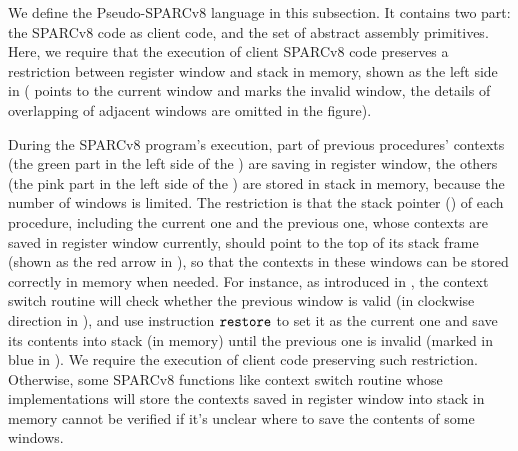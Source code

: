 We define the Pseudo-SPARCv8 language in this 
subsection. It contains two part: 
the SPARCv8 code as client code, 
and the set of abstract assembly primitives. 
Here, we require that the execution of client SPARCv8 code 
preserves a restriction between register 
window and stack in memory, shown
as the left side in \Fig{\ref{fig:Abstraction of Register Windows and Memory}}
(\regcwp{} points to the current window and \regwim{} marks 
the invalid window, the details of overlapping 
of adjacent windows are omitted in the figure).
\begin{center}
    
    \vspace*{-0.5em}
    \label{fig:Abstraction of Register Windows and Memory}
    \vspace{-0.5em}
\end{center}
During the SPARCv8 program's execution, 
part of previous procedures' contexts 
(the green part in the left side of the 
\Fig{\ref{fig:Abstraction of Register Windows and Memory}}) 
are saving in register window, the others 
(the pink part in the left side of the 
\Fig{\ref{fig:Abstraction of Register Windows and Memory}})
are stored in stack in memory, 
because the number of windows is limited. 
The restriction is that the stack pointer 
(\spreg{}) of each procedure, 
including the current one and the previous one, 
whose contexts are saved in register 
window currently, should point to the top of its stack frame 
(shown as the red arrow in 
\Fig{\ref{fig:Abstraction of Register Windows and Memory}}),
so that the contexts 
in these windows can be stored correctly 
in memory when needed. For instance, as  
introduced in \Sec{\ref{sec:ctxswitch}}, the 
context switch routine will check 
whether the previous window is valid 
(in clockwise direction in 
\Fig{\ref{fig:Abstraction of Register Windows and Memory}}), 
and use instruction $\texttt{restore}{}$ to set it as the 
current one and save its contents into stack 
(in memory) until the previous one is invalid 
(marked in blue in \Fig{\ref{fig:Abstraction of Register Windows and Memory}}). 
We require the execution of client code 
preserving such restriction. Otherwise, some SPARCv8 
functions like context switch routine whose 
implementations will store the contexts saved in 
register window into stack in memory cannot be 
verified if it's unclear where to save the 
contents of some windows. 
